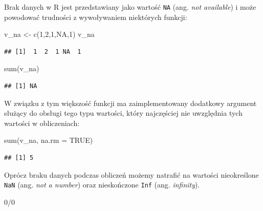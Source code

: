 \documentclass[
]{book}
\newenvironment{Shaded}{\begin{snugshade}}{\end{snugshade}}
\newcommand{\AttributeTok}[1]{\textcolor[rgb]{0.77,0.63,0.00}{#1}}
\newcommand{\ConstantTok}[1]{\textcolor[rgb]{0.00,0.00,0.00}{#1}}
\newcommand{\DecValTok}[1]{\textcolor[rgb]{0.00,0.00,0.81}{#1}}
\newcommand{\FunctionTok}[1]{\textcolor[rgb]{0.00,0.00,0.00}{#1}}
\newcommand{\NormalTok}[1]{#1}
\newcommand{\OtherTok}[1]{\textcolor[rgb]{0.56,0.35,0.01}{#1}}
\newcommand{\SpecialCharTok}[1]{\textcolor[rgb]{0.00,0.00,0.00}{#1}}
\begin{document}
Brak danych w R jest przedstawiany jako wartość \texttt{NA} (ang. \emph{not available}) i może powodować trudności z wywoływaniem niektórych funkcji:

\begin{Shaded}
\begin{Highlighting}[]
\NormalTok{v\_na }\OtherTok{\textless{}{-}} \FunctionTok{c}\NormalTok{(}\DecValTok{1}\NormalTok{,}\DecValTok{2}\NormalTok{,}\DecValTok{1}\NormalTok{,}\ConstantTok{NA}\NormalTok{,}\DecValTok{1}\NormalTok{)}
\NormalTok{v\_na}
\end{Highlighting}
\end{Shaded}

\begin{verbatim}
## [1]  1  2  1 NA  1
\end{verbatim}

\begin{Shaded}
\begin{Highlighting}[]
\FunctionTok{sum}\NormalTok{(v\_na)}
\end{Highlighting}
\end{Shaded}

\begin{verbatim}
## [1] NA
\end{verbatim}

W związku z tym większość funkcji ma zaimplementowany dodatkowy argument służący do obsługi tego typu wartości, który najczęściej nie uwzględnia tych wartości w obliczeniach:

\begin{Shaded}
\begin{Highlighting}[]
\FunctionTok{sum}\NormalTok{(v\_na, }\AttributeTok{na.rm =} \ConstantTok{TRUE}\NormalTok{)}
\end{Highlighting}
\end{Shaded}

\begin{verbatim}
## [1] 5
\end{verbatim}

Oprócz braku danych podczas obliczeń możemy natrafić na wartości nieokreślone \texttt{NaN} (ang. \emph{not a number}) oraz nieskończone \texttt{Inf} (ang. \emph{infinity}).

\begin{Shaded}
\begin{Highlighting}[]
\DecValTok{0}\SpecialCharTok{/}\DecValTok{0}
\end{Highlighting}
\end{Shaded}
\end{document}

